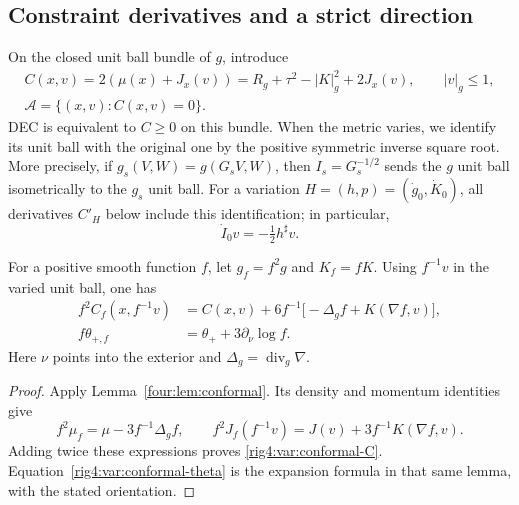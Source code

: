 \subsection{Constraint derivatives and a strict direction}

On the closed unit ball bundle of $g$, introduce
\begin{equation}
\begin{gathered}
 C(x,v)=2(\mu(x)+J_x(v))
       =R_g+\tau^2-|K|_g^2+2J_x(v),\qquad |v|_g\le1,\\
 \mathcal A=\{(x,v):C(x,v)=0\}.
\end{gathered}
\label{rig4:var:active-set}
\end{equation}
DEC is equivalent to $C\ge0$ on this bundle. When the metric varies,
we identify its unit ball with the original one by the positive symmetric
inverse square root. More precisely, if
$g_s(V,W)=g(G_sV,W)$, then $I_s=G_s^{-1/2}$ sends the $g$ unit ball
isometrically to the $g_s$ unit ball. For a variation
$H=(h,p)=(\dot g_0,\dot K_0)$, all derivatives $C'_H$ below include this
identification; in particular,
\[
 \dot I_0v=-\tfrac12h^\sharp v.
\]

\begin{lemma}
\label{rig4:var:conformal}
For a positive smooth function $f$, let $g_f=f^2g$ and $K_f=fK$.
Using $f^{-1}v$ in the varied unit ball, one has
\begin{align}
 f^2 C_f(x,f^{-1}v)
   &=C(x,v)+6f^{-1}\bigl[-\Delta_g f+K(\nabla f,v)\bigr],
       \label{rig4:var:conformal-C}\\
 f\theta_{+,f}
   &=\theta_++3\partial_\nu\log f.
       \label{rig4:var:conformal-theta}
\end{align}
Here $\nu$ points into the exterior and $\Delta_g=\operatorname{div}_g\nabla$.
\end{lemma}

\begin{proof}
Apply Lemma~\ref{four:lem:conformal}. Its density and momentum
identities give
\[
 f^2\mu_f=\mu-3f^{-1}\Delta_gf,\qquad
 f^2J_f(f^{-1}v)=J(v)+3f^{-1}K(\nabla f,v).
\]
Adding twice these expressions proves \eqref{rig4:var:conformal-C}.
Equation~\eqref{rig4:var:conformal-theta} is the expansion formula in that
same lemma, with the stated orientation.
\end{proof}

